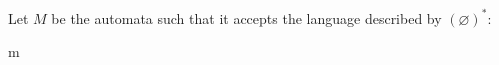 Let $M$ be the automata such that it accepts the language described by $(\varnothing)^*$:
\begin{automata}{m}
	
	
\end{automata}